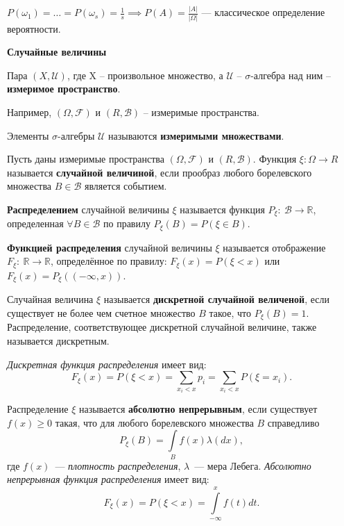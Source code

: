 $P(\omega_1) = \dots = P(\omega_s) = \frac{1}{s} \implies P(A) = \frac{|A|}{|\Omega|}$ --- классическое определение вероятности.

\centerline{\textbf{Случайные величины}}

Пара $(X, \mathcal{U})$, где X – произвольное множество, а $\mathcal{U}$ -- $\sigma$-алгебра над ним -- \textbf{измеримое пространство}. 

Например, $(\Omega, \mathcal{F})$ и $(R, \mathcal{B})$ -- измеримые пространства. 

Элементы  $\sigma$-алгебры $\mathcal{U}$ называются \textbf{измеримыми множествами}.

Пусть даны измеримые пространства $(\Omega, \mathcal{F})$ и $(R, \mathcal{B})$. Функция $\xi : \Omega \rightarrow R$ называется \textbf{случайной величиной}, если прообраз любого борелевского множества $B \in \mathcal{B}$ является событием.

\textbf{Распределением} случайной величины $\xi$ называется функция $P_{\xi}:~\mathcal{B} \rightarrow \mathbb{R}$, определенная $\forall B \in \mathcal{B}$ по правилу $P_{\xi}(B) = P(\xi \in B)$.

\textbf{Функцией распределения} случайной величины $\xi$ называется отображение $F_{\xi}:~\mathbb{R} \rightarrow \mathbb{R}$, определённое по правилу: $F_{\xi}(x) = P(\xi < x)$ или $F_{\xi}(x) = P_{\xi}((-\infty, x))$.

Случайная величина $\xi$ называется \textbf{дискретной случайной величеной}, если существует не более чем счетное множество $B$ такое, что $P_{\xi}(B) = 1$. Распределение, соответствующее дискретной случайной величине, также называется дискретным.

\textit{Дискретная функция распределения} имеет вид:
    \begin{equation*}
        F_\xi(x) = P(\xi < x) = \sum\limits_{x_i < x}{}p_{i} = \sum\limits_{x_i < x}{} P(\xi = x_{i}).
    \end{equation*}


Распределение $\xi$ называется \textbf{абсолютно непрерывным}, если существует
$f(x) \geqslant 0$ такая, что для любого борелевского множества $B$ справедливо
\begin{equation*}
    P_\xi(B) = \int\limits_B f(x) \lambda(dx),
\end{equation*}
где $f(x)$~--- \textit{плотность распределения}, $\lambda$~--- мера Лебега. 
\textit{Абсолютно непрерывная функция распределения} имеет вид:
\begin{equation*}
    F_\xi(x) = P(\xi < x) = \int\limits_{-\infty}^x f(t)dt.
\end{equation*}


